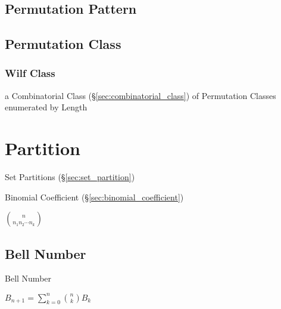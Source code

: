\subsection{Permutation Pattern}\label{sec:permutation_pattern}

\subsection{Permutation Class}\label{sec:permutation_class}

\subsubsection{Wilf Class}\label{sec:wilf_class}

a Combinatorial Class (\S\ref{sec:combinatorial_class}) of Permutation Classes
enumerated by Length



\section{Partition}\label{sec:partition}

Set Partitions (\S\ref{sec:set_partition})

Binomial Coefficient (\S\ref{sec:binomial_coefficient})

$\binom{n}{n_1 n_2 \cdots n_k}$



\subsection{Bell Number}\label{sec:bell_number}

Bell Number

$B_{n+1} = \sum_{k=0}^n \binom{n}{k} B_k$



